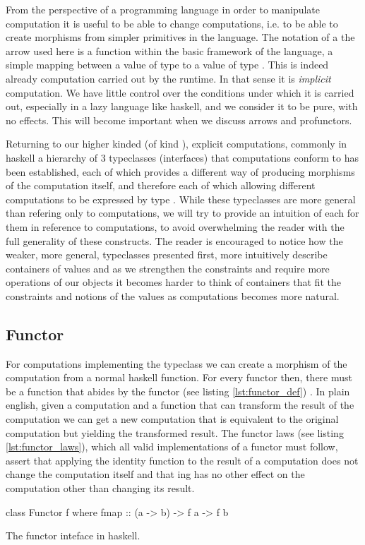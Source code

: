 From the perspective of a programming language in order to manipulate
computation it is useful to be able to change computations, i.e. to be
able to create morphisms  from simpler primitives in the
language. The notation of a the arrow \hask{->} used here is a function
within the basic framework of the language, a simple mapping between a
value of type  to a value of type . This is indeed already
computation carried out by the runtime.  In that sense it is
\emph{implicit} computation. We have little control over the
conditions under which it is carried out, especially in a lazy
language like haskell, and we consider it to be pure, with no
effects. This will become important when we discuss arrows and
profunctors.

Returning to our higher kinded (of kind \hask{* -> *}), explicit
computations, commonly in haskell a hierarchy of 3 typeclasses
(interfaces) that computations conform to has been established, each
of which provides a different way of producing morphisms of the
computation itself, and therefore each of which allowing different
computations to be expressed by type . While these typeclasses are
more general than refering only to computations, we will try to
provide an intuition of each for them in reference to computations, to
avoid overwhelming the reader with the full generality of these
constructs. The reader is encouraged to notice how the weaker, more
general, typeclasses presented first, more intuitively describe
containers of values and as we strengthen the constraints and require
more operations of our objects it becomes harder to think of
containers that fit the constraints and notions of the values as
computations becomes more natural.

\subsection{Functor}

For computations implementing the  typeclass we can
create a morphism of the computation from a normal haskell
function. For every functor  then, there must be a function
 that abides by the functor (see
listing \ref{lst:functor_def})
\cite{mcbrideApplicativeProgrammingEffects2008}. In plain english,
given a computation and a function that can transform the result of
the computation we can get a new computation that is equivalent to the
original computation but yielding the transformed result. The functor
laws (see listing \ref{lst:functor_laws}), which all valid
implementations of a functor must follow, assert that applying the
identity function to the result of a computation does not change the
computation itself and that  ing has no other effect on the
computation other than changing its result.
\begin{code}
\begin{haskellcode}
class Functor f where
  fmap :: (a -> b) -> f a -> f b
\end{haskellcode}
\caption{\label{lst:functor_def}The functor inteface in haskell.}
\end{code}

